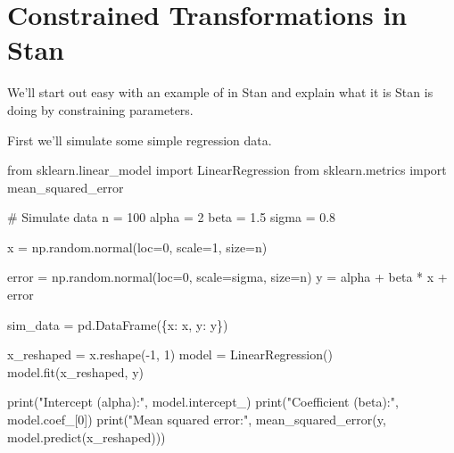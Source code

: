 \documentclass[
  letterpaper,
  DIV=11,
  numbers=noendperiod]{scrartcl}
\newenvironment{Shaded}{\begin{snugshade}}{\end{snugshade}}
\newcommand{\BuiltInTok}[1]{\textcolor[rgb]{0.00,0.23,0.31}{#1}}
\newcommand{\CommentTok}[1]{\textcolor[rgb]{0.37,0.37,0.37}{#1}}
\newcommand{\DecValTok}[1]{\textcolor[rgb]{0.68,0.00,0.00}{#1}}
\newcommand{\FloatTok}[1]{\textcolor[rgb]{0.68,0.00,0.00}{#1}}
\newcommand{\ImportTok}[1]{\textcolor[rgb]{0.00,0.46,0.62}{#1}}
\newcommand{\NormalTok}[1]{\textcolor[rgb]{0.00,0.23,0.31}{#1}}
\newcommand{\OperatorTok}[1]{\textcolor[rgb]{0.37,0.37,0.37}{#1}}
\newcommand{\StringTok}[1]{\textcolor[rgb]{0.13,0.47,0.30}{#1}}
\begin{document}
\section{Constrained Transformations in
Stan}\label{constrained-transformations-in-stan}

We'll start out easy with an example of in Stan and explain what it is
Stan is doing by constraining parameters.

First we'll simulate some simple regression data.

\begin{Shaded}
\begin{Highlighting}[]
\ImportTok{from}\NormalTok{ sklearn.linear\_model }\ImportTok{import}\NormalTok{ LinearRegression}
\ImportTok{from}\NormalTok{ sklearn.metrics }\ImportTok{import}\NormalTok{ mean\_squared\_error}

\CommentTok{\# Simulate data}
\NormalTok{n }\OperatorTok{=} \DecValTok{100}
\NormalTok{alpha }\OperatorTok{=} \DecValTok{2}
\NormalTok{beta }\OperatorTok{=} \FloatTok{1.5}
\NormalTok{sigma }\OperatorTok{=} \FloatTok{0.8}

\NormalTok{x }\OperatorTok{=}\NormalTok{ np.random.normal(loc}\OperatorTok{=}\DecValTok{0}\NormalTok{, scale}\OperatorTok{=}\DecValTok{1}\NormalTok{, size}\OperatorTok{=}\NormalTok{n)}

\NormalTok{error }\OperatorTok{=}\NormalTok{ np.random.normal(loc}\OperatorTok{=}\DecValTok{0}\NormalTok{, scale}\OperatorTok{=}\NormalTok{sigma, size}\OperatorTok{=}\NormalTok{n)}
\NormalTok{y }\OperatorTok{=}\NormalTok{ alpha }\OperatorTok{+}\NormalTok{ beta }\OperatorTok{*}\NormalTok{ x }\OperatorTok{+}\NormalTok{ error}

\NormalTok{sim\_data }\OperatorTok{=}\NormalTok{ pd.DataFrame(\{}\StringTok{\textquotesingle{}x\textquotesingle{}}\NormalTok{: x, }\StringTok{\textquotesingle{}y\textquotesingle{}}\NormalTok{: y\})}

\NormalTok{x\_reshaped }\OperatorTok{=}\NormalTok{ x.reshape(}\OperatorTok{{-}}\DecValTok{1}\NormalTok{, }\DecValTok{1}\NormalTok{)}
\NormalTok{model }\OperatorTok{=}\NormalTok{ LinearRegression()}
\NormalTok{model.fit(x\_reshaped, y)}

\BuiltInTok{print}\NormalTok{(}\StringTok{"Intercept (alpha):"}\NormalTok{, model.intercept\_)}
\BuiltInTok{print}\NormalTok{(}\StringTok{"Coefficient (beta):"}\NormalTok{, model.coef\_[}\DecValTok{0}\NormalTok{])}
\BuiltInTok{print}\NormalTok{(}\StringTok{"Mean squared error:"}\NormalTok{, mean\_squared\_error(y, model.predict(x\_reshaped)))}


\end{Highlighting}
\end{Shaded}
\end{document}
